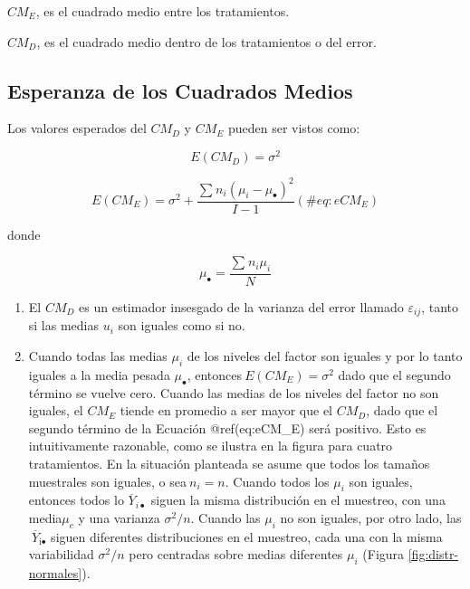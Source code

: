 \documentclass[]{book}
\theoremstyle{definition}
\theoremstyle{definition}
\theoremstyle{definition}
\theoremstyle{remark}
\begin{document}
\(CM_E\), es el cuadrado medio entre los tratamientos.

\(CM_D\), es el cuadrado medio dentro de los tratamientos o del error.

\hypertarget{esperanza-de-los-cuadrados-medios}{%
\subsection{Esperanza de los Cuadrados
Medios}\label{esperanza-de-los-cuadrados-medios}}

Los valores esperados del \(CM_D\) y \(CM_E\) pueden ser vistos como:

\[
E\left( CM_D \right) = \sigma^{2}
\]

\begin{equation}
E\left( CM_E \right) = \sigma^{2} + \frac{\sum_{}^{}{n_{i}\left( \mu_{i} - \mu_{\bullet} \right)^{2}}}{I - 1}
  (\#eq:eCM_E)
\end{equation}

donde

\[
\mu_{\bullet} = \frac{\sum_{}^{}{n_{i}\mu_{i}}}{N}
\]

\begin{enumerate}
\def\labelenumi{\arabic{enumi}.}
\item
  El \(CM_D\) es un estimador insesgado de la varianza del error llamado
  \(\varepsilon_{ij}\), tanto si las medias \(u_{i}\) son iguales como
  si no.
\item
  Cuando todas las medias \(\mu_i\) de los niveles del factor son
  iguales y por lo tanto iguales a la media pesada \(\mu_{\bullet}\),
  entonces\(\ E(CM_E) = \sigma^{2}\) dado que el segundo término se
  vuelve cero. Cuando las medias de los niveles del factor no son
  iguales, el \(CM_E\) tiende en promedio a ser mayor que el \(CM_D\),
  dado que el segundo término de la Ecuación @ref(eq:eCM\_E) será
  positivo. Esto es intuitivamente razonable, como se ilustra en la
  figura para cuatro tratamientos. En la situación planteada se asume
  que todos los tamaños muestrales son iguales, o sea\(\ n_{i} = n\).
  Cuando todos los \(\mu_{i}\) son iguales, entonces todos lo
  \(\overline{Y}_{i\bullet}\) siguen la misma distribución en el
  muestreo, con una media\(\mu_{c}\) y una varianza \(\sigma^{2}/n\).
  Cuando las \(\mu_{i}\) no son iguales, por otro lado,
  las\(\ {\overline{Y}}_{\text{i}\bullet}\) siguen diferentes
  distribuciones en el muestreo, cada una con la misma variabilidad
  \(\sigma^{2}/n\) pero centradas sobre medias diferentes \(\mu_{i}\)
  (Figura \ref{fig:distr-normales}).
\end{enumerate}
\end{document}
